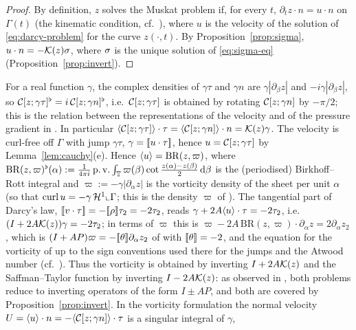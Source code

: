 \begin{proof}
By definition, $z$ solves the Muskat problem if, for every $t$, $\partial_tz\cdot n=u\cdot n$ on $\Gamma(t)$ (the kinematic condition, cf.\ \cite[(3.1)]{LM26}), where $u$ is the velocity
of the solution of \eqref{eq:darcy-problem} for the curve $z(\cdot,t)$. By Proposition~\ref{prop:sigma}, $u\cdot n=-\mathcal{K}(z)\sigma$, where $\sigma$ is the unique solution of
\eqref{eq:sigma-eq} (Proposition~\ref{prop:invert}).
\end{proof}

\begin{remark}\label{rem:duality}
For a real function $\gamma$, the complex densities of $\gamma\tau$ and $\gamma n$ are $\gamma|\partial_\beta z|$ and $-i\gamma|\partial_\beta z|$, so $\mathcal{C}[z;\gamma\tau]^\flat=i\,\mathcal{C}[z;\gamma n]^\flat$, i.e.\
$\mathcal{C}[z;\gamma\tau]$ is obtained by rotating $\mathcal{C}[z;\gamma n]$ by $-\pi/2$; this is the relation between the representations of the velocity and of the pressure gradient in \cite[(3.2)]{LM26}.
In particular $\langle \mathcal{C}[z;\gamma\tau]\rangle\cdot\tau=\langle \mathcal{C}[z;\gamma n]\rangle\cdot n=\mathcal{K}(z)\gamma$. The velocity is curl-free off $\Gamma$ with jump $\gamma\tau$, $\gamma=[\![u\cdot\tau]\!]$, hence
$u=\mathcal{C}[z;\gamma\tau]$ by Lemma~\ref{lem:cauchy}(e). Hence $\langle u\rangle=\mathrm{BR}(z,\varpi)$, where
$\mathrm{BR}(z,\varpi)^\flat(\alpha):=\frac1{4\pi i}\operatorname{p.v.}\int_{\mathbb{T}}\varpi(\beta)\cot\frac{z(\alpha)-z(\beta)}2\,\mathrm{d}\beta$ is the (periodised) Birkhoff--Rott integral and $\varpi:=-\gamma|\partial_\alpha z|$
is the vorticity density of the sheet per unit $\alpha$ (so that $\operatorname{curl} u=-\gamma\,\mathcal H^1\llcorner\Gamma$; this is the density $\varpi$ of \cite{LM26}). The tangential part of Darcy's law,
$[\![v\cdot\tau]\!]=-[\![\rho]\!]\tau_2=-2\tau_2$, reads $\gamma+2A\langle u\rangle\cdot\tau=-2\tau_2$, i.e.\ $(I+2A\mathcal{K}(z))\gamma=-2\tau_2$; in terms of $\varpi$ this is
$\varpi-2A\,\mathrm{BR}(z,\varpi)\cdot\partial_\alpha z=2\partial_\alpha z_2$, which is $(I+AP)\varpi=-[\![\theta]\!]\partial_\alpha z_2$ of \cite[Sec.~3.1.3]{LM26} with $[\![\theta]\!]=-2$, and the
equation for the vorticity of \cite{CCG11} up to the sign conventions used there for the jumps and the Atwood number (cf.\ \cite[Sec.~3.1.3]{LM26}). Thus the vorticity is obtained by
inverting $I+2A\mathcal{K}(z)$ and the Saffman--Taylor function by inverting $I-2A\mathcal{K}(z)$: as observed in \cite[Sec.~3.1.3]{LM26}, both problems reduce to inverting operators of the form $I\pm AP$,
and both are covered by Proposition~\ref{prop:invert}. In the vorticity formulation the normal velocity $U=\langle u\rangle\cdot n=-\langle \mathcal{C}[z;\gamma n]\rangle\cdot\tau$ is a singular integral of $\gamma$,

\end{remark}
